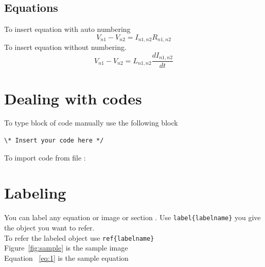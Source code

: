 \documentclass[11pt, a4paper]{article}
\begin{document}
 
 \subsection{Equations}
 To insert equation with auto numbering
  \begin{equation}\label{eq:1}
  V_{n1}-V_{n2}=I_{n1,n2} R_{n1,n2}
  \end{equation}
  To insert equation without numbering.
\begin{equation*}
 V_{n1}-V_{n2}=L_{n1,n2} \frac{dI_{n1,n2}}{dt}
\end{equation*}
\section{Dealing with codes}
To type block of code manually use the following block
\begin{verbatim}	
\* Insert your code here */ 
\end{verbatim}
To import code from file : 

\section{Labeling}
You can label any equation or image or section . Use \texttt{label\{labelname\}}  you give the object you want to refer.\\
To refer the labeled object use \texttt{ref\{labelname\}} \\
Figure~\ref{fig:sample} is the sample image \\
Equation ~\ref{eq:1} is the sample equation 
\end{document}
